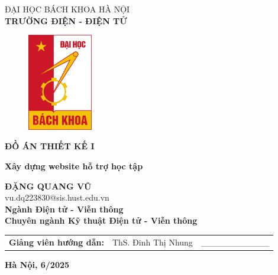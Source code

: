 \documentclass{article}
\begin{document}
	\setmainfont{Times New Roman}
	\thispagestyle{empty}
	\begin{center}
		\vspace{-12pt}  \fontsize{14pt}{0pt}\selectfont ĐẠI HỌC BÁCH KHOA HÀ NỘI \\[6pt]
		\textbf{\fontsize{16pt}{0pt}\selectfont TRƯỜNG ĐIỆN - ĐIỆN TỬ}
		\vspace{1.75cm}
		\begin{figure}[H]
			\centering
			\includegraphics[height=4.25cm]{logoHUST.png}
		\end{figure}
		\vspace{1cm}
		\textbf{\fontsize{25pt}{0pt}\selectfont ĐỒ ÁN THIẾT KẾ I} 
		\vspace{0.5cm}
	\end{center}
	\begin{center}
		\textbf{\fontsize{22pt}{0pt}\selectfont Xây dựng website hỗ trợ học tập} \\
		\vspace{2.5cm}
		
		\textbf{\fontsize{18pt}{0pt}\selectfont ĐẶNG QUANG VŨ} \\[6pt]
		\fontsize{16pt}{0pt}\selectfont vu.dq223830@sis.hust.edu.vn \\[6pt]
		\vspace{0.75cm}
		\textbf{\fontsize{16pt}{0pt}\selectfont Ngành Điện tử - Viễn thông} \\[6pt]
		\textbf{\fontsize{16pt}{0pt}\selectfont Chuyên ngành Kỹ thuật Điện tử - Viễn thông} 
		\vspace{0.75cm}
		\begin{table}[H]
			\centering
			\begin{tabular}{l l l}
				\fontsize{16pt}{0pt}\selectfont \textbf{Giảng viên hướng dẫn:}    & \fontsize{16pt}{0pt}\selectfont ThS. Đinh Thị Nhung \vspace{6pt} & \_\_\_\_\_\_\_\_\_\_\_ \\ 
			\end{tabular}
		\end{table}
		\vspace{2.5cm}
		\fontsize{14pt}{0pt}\selectfont \textbf{Hà Nội, 6/2025}
	\end{center}
\end{document}
